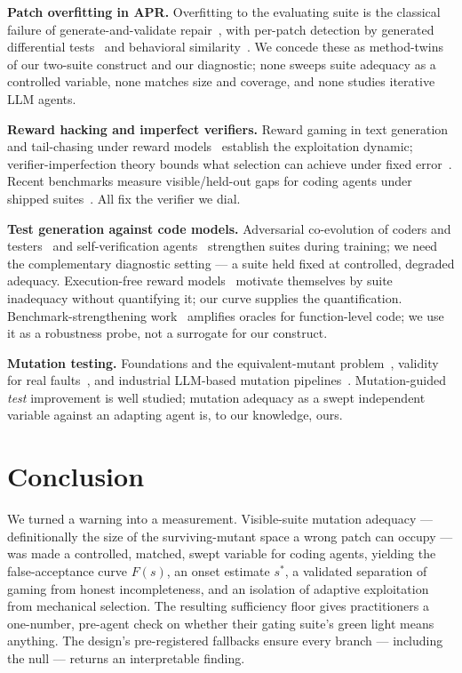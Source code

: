 \documentclass[conference]{IEEEtran}
\newcommand{\Fs}{\ensuremath{F(s)}}
\begin{document}
\textbf{Patch overfitting in APR.} Overfitting to the evaluating suite
is the classical failure of generate-and-validate
repair~\cite{Smith2015Overfitting,Qi2015PatchPlausibility}, with
per-patch detection by generated differential
tests~\cite{XinReiss2017DiffTGen} and behavioral
similarity~\cite{Xiong2018PatchSim}. We concede these as method-twins of
our two-suite construct and our diagnostic; none sweeps suite adequacy
as a controlled variable, none matches size and coverage, and none
studies iterative LLM agents.

\textbf{Reward hacking and imperfect verifiers.} Reward gaming in text
generation~\cite{acl_pang_etal_2023_reward,acl_he_etal_2023_blind} and
tail-chasing under reward models~\cite{ChasingTail_pBjy4ek2QV}
establish the exploitation dynamic; verifier-imperfection theory bounds
what selection can achieve under fixed
error~\cite{ResamplingLimits_j8H84v6AZ1,ROCnReroll_3Gy5mmyuxn}. Recent
benchmarks measure visible/held-out gaps for coding agents under
shipped suites~\cite{SpecBench_2605_21384,RHB_2605_02964}. All fix the
verifier we dial.

\textbf{Test generation against code models.} Adversarial co-evolution
of coders and testers~\cite{CURE_wPdBe9zxNr,ATGen_Sxj4o3qXtl,
UTRL_VqjNYF9nbP} and self-verification agents~\cite{ReVeal_q56ZI1Co43}
strengthen suites during training; we need the complementary diagnostic
setting --- a suite held fixed at controlled, degraded adequacy.
Execution-free reward models~\cite{2512_21919} motivate themselves by
suite inadequacy without quantifying it; our curve supplies the
quantification. Benchmark-strengthening work~\cite{EvalPlus_Liu2023}
amplifies oracles for function-level code; we use it as a robustness
probe, not a surrogate for our construct.

\textbf{Mutation testing.} Foundations and the equivalent-mutant
problem~\cite{Papadakis2019Survey,Papadakis2015TCE,Just2011Major},
validity for real faults~\cite{Just2014Valid}, and industrial LLM-based
mutation pipelines~\cite{Foster2025ACH}. Mutation-guided \emph{test}
improvement is well studied; mutation adequacy as a swept independent
variable against an adapting agent is, to our knowledge, ours.

\section{Conclusion}\label{sec:conclusion}
We turned a warning into a measurement. Visible-suite mutation adequacy
--- definitionally the size of the surviving-mutant space a wrong patch
can occupy --- was made a controlled, matched, swept variable for coding
agents, yielding the false-acceptance curve \Fs{}, an onset estimate
$s^\ast$, a validated separation of gaming from honest incompleteness,
and an isolation of adaptive exploitation from mechanical selection.
The resulting sufficiency floor gives practitioners a one-number,
pre-agent check on whether their gating suite's green light means
anything. The design's pre-registered fallbacks ensure every branch ---
including the null --- returns an interpretable finding.
\end{document}
